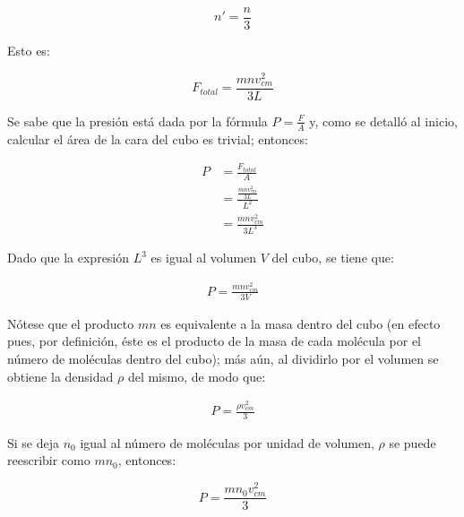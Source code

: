 \documentclass{article}
\begin{document}
\[
    n' = \frac{n}{3}
\]

Esto es:

\[
    F_{total} = \frac{m n v_{cm}^2}{3 L}
\]

Se sabe que la presión está dada por la fórmula \(P = \frac{F}{A}\)
y, como se detalló al inicio, calcular el área de la cara
del cubo es trivial; entonces:

\begin{align*}
    P   &= \frac{F_{total}}{A} \\
        &= \frac{\frac{m n v_{cm}^2}{3 L}}{L^2} \\
        &= \frac{m n v_{cm}^2}{3 L^3}
\end{align*}

Dado que la expresión \(L^3\) es igual al volumen \(V\) del cubo,
se tiene que:

\begin{align*}
    P = \frac{m n v_{cm}^2}{3 V}
\end{align*}

Nótese que el producto \(m n\) es equivalente a la masa
dentro del cubo (en efecto pues, por definición, éste es el producto
de la masa de cada molécula por el número de moléculas dentro
del cubo); más aún, al dividirlo por el volumen se obtiene la 
densidad \(\rho\) del mismo, de modo que:

\begin{align}
    P = \frac{\rho v_{cm}^2}{3}
\end{align}

Si se deja \(n_0\) igual al número de moléculas por unidad 
de volumen, \(\rho\) se puede reescribir como \(m n_0\), entonces:

\[
    P = \frac{m n_0 v_{cm}^2}{3}
\]
\end{document}
